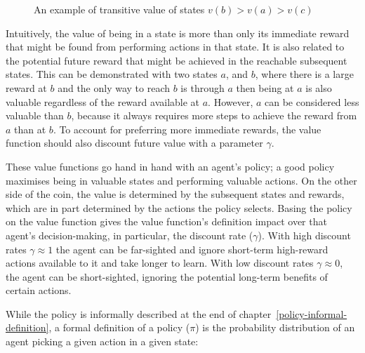 \documentclass[]{final_report}
\begin{document}
\begin{figure}[H]
  \centering
  \fboxsep 2mm
  \caption{\label{fig:reward-example} An example of transitive value of states $v(b) > v(a) > v(c)$}
\end{figure}

Intuitively, the value of being in a state is more than only its immediate reward that might be found from performing actions in that state. It is also related to the potential future reward that might be achieved in the reachable subsequent states. This can be demonstrated with two states $a$, and $b$, where there is a large reward at $b$ and the only way to reach $b$ is through $a$ then being at $a$ is also valuable regardless of the reward available at $a$. However, $a$ can be considered less valuable than $b$, because it always requires more steps to achieve the reward from $a$ than at $b$. To account for preferring more immediate rewards, the value function should also discount future value with a parameter $\gamma$. 


These value functions go hand in hand with an agent's policy; a good policy maximises being in valuable states and performing valuable actions. On the other side of the coin, the value is determined by the subsequent states and rewards, which are in part determined by the actions the policy selects. Basing the policy on the value function gives the value function's definition impact over that agent's decision-making, in particular, the discount rate ($\gamma$). With high discount rates $\gamma \approx 1$ the agent can be far-sighted and ignore short-term high-reward actions available to it and take longer to learn. With low discount rates $\gamma \approx 0$, the agent can be short-sighted, ignoring the potential long-term benefits of certain actions.

While the policy is informally described at the end of chapter~\ref{policy-informal-definition}, a formal definition of a policy ($\pi$) is the probability distribution of an agent picking a given action in a given state:
\end{document}
